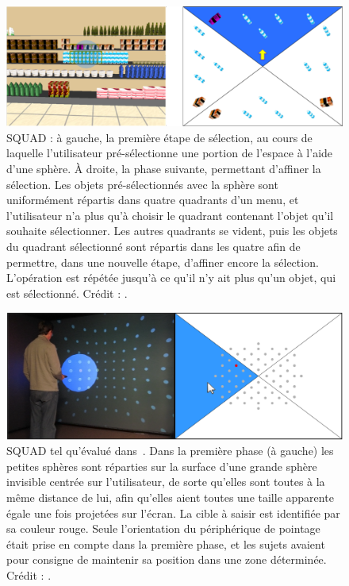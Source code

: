 \begin{appendices}
	
	\begin{figure}[!htbp]
		\centering
		\includegraphics[width=\textwidth]{figures/ch2/squad}
		\caption[Fonctionnement de la technique SQUAD]{SQUAD : à gauche, la première étape de sélection, au cours de laquelle l'utilisateur pré-sélectionne une portion de l'espace à l'aide d'une sphère. À droite, la phase suivante, permettant d'affiner la sélection. Les objets pré-sélectionnés avec la sphère sont uniformément répartis dans quatre quadrants d'un menu, et l'utilisateur n'a plus qu'à choisir le quadrant contenant l'objet qu'il souhaite sélectionner. Les autres quadrants se vident, puis les objets du quadrant sélectionné sont répartis dans les quatre afin de permettre, dans une nouvelle étape, d'affiner encore la sélection. L'opération est répétée jusqu'à ce qu'il n'y ait plus qu'un objet, qui est sélectionné. Crédit : \cite{kopper2011rapid}.}
		\label{fig:squad}
	\end{figure}
	
	
	
	
	\begin{figure}[!htbp]
		\centering
		\includegraphics[width=\textwidth]{figures/ch2/squad2}
		\caption[La technique SQUAD -- évaluation]{SQUAD tel qu'évalué dans~\cite{kopper2011rapid}. Dans la première phase (à gauche) les petites sphères sont réparties sur la surface d'une grande sphère invisible centrée sur l'utilisateur, de sorte qu'elles sont toutes à la même distance de lui, afin qu'elles aient toutes une taille apparente égale une fois projetées sur l'écran. La cible à saisir est identifiée par sa couleur rouge. Seule l'orientation du périphérique de pointage était prise en compte dans la première phase, et les sujets avaient pour consigne de maintenir sa position dans une zone déterminée. Crédit : \cite{kopper2011rapid}.}
		\label{fig:squad2}
	\end{figure}
	



\end{appendices}
